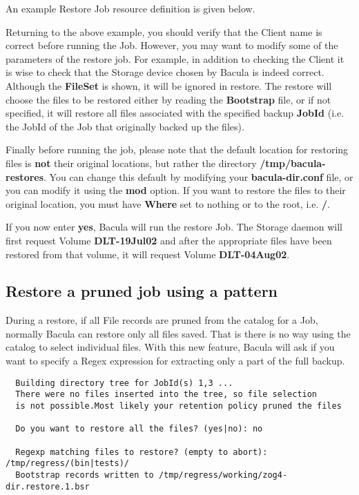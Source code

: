 An example Restore Job resource definition is given below. 

Returning to the above example, you should verify that the Client name is
correct before running the Job. However, you may want to modify some of the
parameters of the restore job. For example, in addition to checking the Client
it is wise to check that the Storage device chosen by Bacula is indeed
correct. Although the {\bf FileSet} is shown, it will be ignored in restore.
The restore will choose the files to be restored either by reading the {\bf
Bootstrap} file, or if not specified, it will restore all files associated
with the specified backup {\bf JobId} (i.e. the JobId of the Job that
originally backed up the files). 

Finally before running the job, please note that the default location for
restoring files is {\bf not} their original locations, but rather the directory
{\bf /tmp/bacula-restores}. You can change this default by modifying your {\bf
bacula-dir.conf} file, or you can modify it using the {\bf mod} option. If you
want to restore the files to their original location, you must have {\bf
Where} set to nothing or to the root, i.e. {\bf /}. 

If you now enter {\bf yes}, Bacula will run the restore Job. The Storage
daemon will first request Volume {\bf DLT-19Jul02} and after the appropriate
files have been restored from that volume, it will request Volume {\bf
DLT-04Aug02}. 

\subsection{Restore a pruned job using a pattern}
  During a restore, if all File records are pruned from the catalog
  for a Job, normally Bacula can restore only all files saved. That
  is there is no way using the catalog to select individual files.
  With this new feature, Bacula will ask if you want to specify a Regex
  expression for extracting only a part of the full backup.

\begin{verbatim}
  Building directory tree for JobId(s) 1,3 ...
  There were no files inserted into the tree, so file selection
  is not possible.Most likely your retention policy pruned the files
  
  Do you want to restore all the files? (yes|no): no
  
  Regexp matching files to restore? (empty to abort): /tmp/regress/(bin|tests)/
  Bootstrap records written to /tmp/regress/working/zog4-dir.restore.1.bsr
\end{verbatim}

